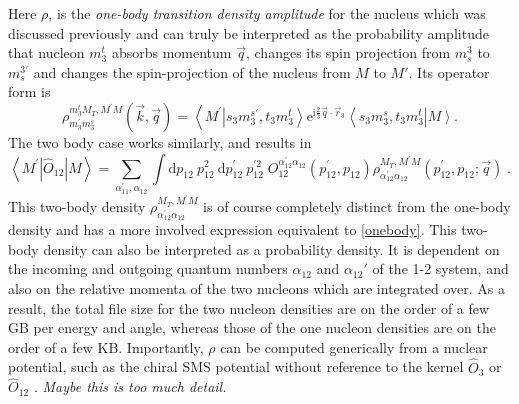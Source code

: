 \documentclass[a4paper,11pt]{article}
\newcommand\bv[1]{\vec{#1}}
\newcommand{\ques}[1]{\color{red}\textit{ #1 }\color{black}}
\begin{document}
Here $\rho$, is the \textit{one-body transition density amplitude}
for the nucleus which was discussed previously and can truly be
interpreted as the probability amplitude that nucleon $m_3^t$ absorbs
momentum $\bv{q}$, changes its spin projection from $m_s^3$ to
$m_s^{3'}$ and changes the spin-projection of the nucleus from $M$ to
$M'$. Its operator form is
\begin{equation}
  \rho_{m_{3}^{\prime} m_{3}^{s}}^{m_{3}^{t} M_{T}, M^{\prime}
  M}(\bv{k}, \bv{q})=\left\langle M^{\prime}\right.\left|s_{3}
  m_{3}^{s \prime}, t_{3} m_{3}^{t}\right\rangle
  \mathrm{e}^{\mathrm{i} \frac{2}{3} \bv{q} \cdot
  \bv{r}_{3}}\left\langle s_{3} m_{3}^{s}, t_{3}
  m_{3}^{t}\right|\left. M\right\rangle\label{onebody}.
\end{equation}
The two body case works similarly, and results in
\begin{equation}
  \left\langle M^{\prime}\left|\hat{O}_{12}\right| M\right\rangle =
  \sum_{\alpha_{11}^{\prime}, \alpha_{12}} \int \mathrm{d} p_{12}\:
  p_{12}^{2} \mathrm{~d} p_{12}^{\prime}\: p_{12}^{\prime 2}\;
  O_{12}^{\alpha_{12}^{\prime} \alpha_{12}}\left(p_{12}^{\prime},
  p_{12}\right) \rho_{\alpha_{12}^{\prime} \alpha_{12}}^{M_{T},
  M^{\prime} M}\left(p_{12}^{\prime}, p_{12} ; \bv{q}\right)\label{twobody}\;.
\end{equation}
This two-body density $\rho_{\alpha_{12}^{\prime}
\alpha_{12}}^{M_{T}, M^{\prime} M}$ is of course completely distinct
from the one-body density and has a more involved expression
equivalent to \eqref{onebody}.
This two-body density can also be interpreted as a probability density.
It is dependent on the incoming and outgoing quantum numbers
$\alpha_{12}$ and $\alpha_{12}'$ of the 1-2 system, and also on the
relative momenta of the two nucleons which are integrated over.
As a result, the total file size for the two nucleon densities are on
the order of a few GB per energy and angle, whereas those of the one
nucleon densities are on the order of a few KB.
Importantly, $\rho$ can be computed generically from a nuclear
potential, such as the chiral SMS potential
without reference to the kernel $\hat{O}_3$ or $\hat{O}_{12}$
\cite{Reinert2018}.
\ques{Maybe this is too much detail.}
\end{document}
